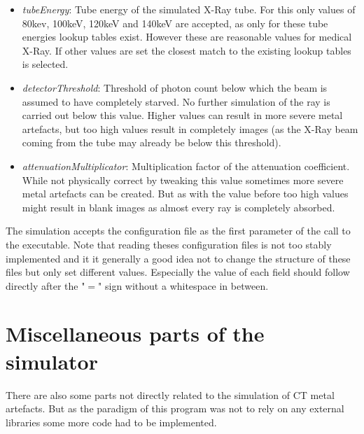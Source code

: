 \begin{itemize}
	\item\emph{tubeEnergy}: Tube energy of the simulated X-Ray tube. For this only values of 80kev, 100keV, 120keV and 140keV are accepted, as only for these tube energies lookup tables exist. However these are reasonable values for medical X-Ray. If other values are set the closest match to the existing lookup tables is selected.
	\item\emph{detectorThreshold}: Threshold of photon count below which the beam is assumed to have completely starved. No further simulation of the ray is carried out below this value. Higher values can result in more severe metal artefacts, but too high values result in completely images (as the X-Ray beam coming from the tube may already be below this threshold).
	\item\emph{attenuationMultiplicator}: Multiplication factor of the attenuation coefficient. While not physically correct by tweaking this value sometimes more severe metal artefacts can be created. But as with the value before too high values might result in blank images as almost every ray is completely absorbed.
\end{itemize}
\par The simulation accepts the configuration file as the first parameter of the call to the executable. Note that reading theses configuration files is not too stably implemented and it it generally a good idea not to change the structure of these files but only set different values. Especially the value of each field should follow directly after the "\(=\)" sign without a whitespace in between.
\section{Miscellaneous parts of the simulator}
\par There are also some parts not directly related to the simulation of CT metal artefacts. But as the paradigm of this program was not to rely on any external libraries some more code had to be implemented. 
